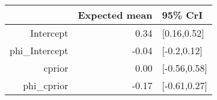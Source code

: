\begin{tabular}{rrl}
  \hline
 & Expected mean & 95\% CrI \\ 
  \hline
Intercept & 0.34 & [0.16,0.52] \\ 
  phi\_Intercept & -0.04 & [-0.2,0.12] \\ 
  cprior & 0.00 & [-0.56,0.58] \\ 
  phi\_cprior & -0.17 & [-0.61,0.27] \\ 
   \hline
\end{tabular}

